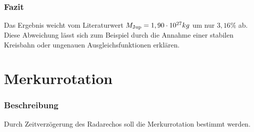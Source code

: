 \documentclass[12pt]{article}
\begin{document}
\subsubsection*{Fazit}
Das Ergebnis weicht vom Literaturwert $M_{\textnormal{Jup}} = 1,90 \cdot 10^{27}kg$ um nur $3,16 \%$ ab. Diese Abweichung lässt sich zum Beispiel durch die Annahme einer stabilen Kreisbahn oder ungenauen Ausgleichsfunktionen erklären.
\newpage\noindent
\section{Merkurrotation}
\subsubsection*{Beschreibung}
Durch Zeitverzögerung des Radarechos soll die Merkurrotation bestimmt werden.
\end{document}
